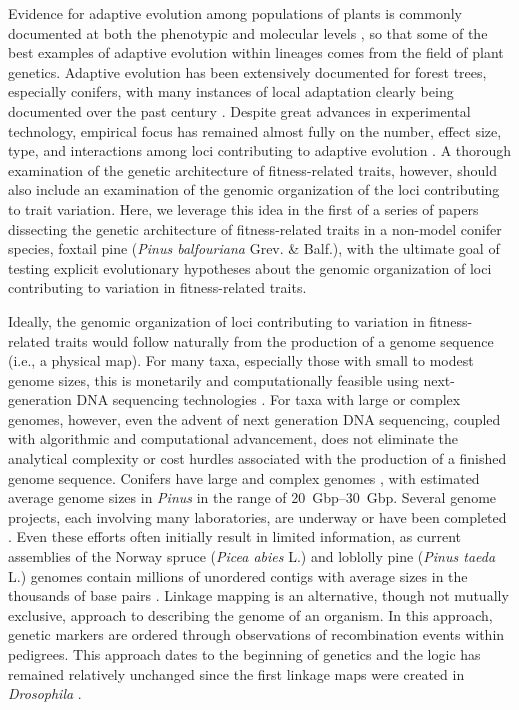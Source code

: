 \documentclass[11pt]{article}
\begin{document}
Evidence for adaptive evolution among populations of plants is commonly documented at both the phenotypic 
and molecular levels \citep{Kawecki:2004, Pannell:2013}, so that some of the best
examples of adaptive evolution within lineages comes from the field of plant genetics.
Adaptive evolution has been extensively documented for forest trees, especially conifers, with many instances of local adaptation clearly
being documented over the past century \citep{White:2007, Neale:2011}. Despite great advances in experimental technology, empirical 
focus has remained almost fully on the number, effect size, type, and interactions among loci contributing 
to adaptive evolution \citep{Neale:2011, Alberto:2013}.  A thorough examination of the 
genetic architecture of fitness-related traits, however, should also include 
an examination of the genomic organization of the loci contributing to trait variation. Here, we leverage 
this idea in the first of a series of papers dissecting the genetic architecture of fitness-related 
traits in a non-model conifer species, foxtail pine (\textit{Pinus balfouriana} Grev. \& Balf.), with the 
ultimate goal of testing explicit evolutionary hypotheses about the genomic organization of loci 
contributing to variation in fitness-related traits.

Ideally, the genomic organization of loci contributing to variation in fitness-related traits would follow 
naturally from the production of a genome sequence (i.e., a physical map). For many taxa, especially those with 
small to modest genome sizes, this is monetarily and computationally feasible using next-generation DNA sequencing 
technologies \citep{Koboldt:2013}. For taxa with large or complex genomes, however, even the advent of next generation DNA 
sequencing, coupled with algorithmic and computational advancement, does not eliminate the analytical complexity or cost hurdles 
associated with the production of a finished genome sequence. Conifers have large and 
complex genomes \citep{Murray:1998, Ahuja:2005}, with estimated average genome sizes in \textit{Pinus} in the 
range of \SIrange{20}{30}{Gbp}. Several genome projects, each involving many laboratories, are underway or have been 
completed \citep{Mackay:2012}. Even these efforts often initially result in limited information, 
as current assemblies of the Norway spruce (\textit{Picea abies} L.) and loblolly pine (\textit{Pinus taeda} L.) genomes 
contain millions of unordered contigs with average sizes in the thousands of base pairs \citep{Nystedt:2013}. Linkage mapping is 
an alternative, though not mutually exclusive, approach to describing the genome of an organism. In this approach, genetic markers 
are ordered through observations of recombination events within pedigrees. This approach dates to the beginning of 
genetics and the logic has remained relatively unchanged since the first linkage maps were created in 
\textit{Drosophila} \citep{Sturtevant:1913}.
\end{document}
